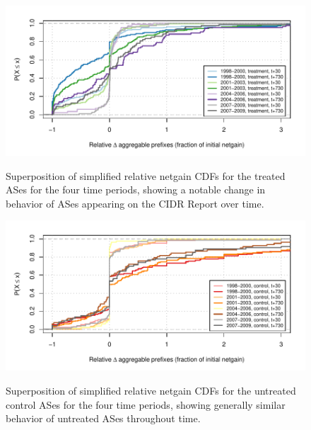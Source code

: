 \clearpage
\begin{figure}[H]
\begin{centering}
\begin{singlespace}
\captionsetup{list=no}
    \includegraphics[width=6in]
        {figures/behavior-rel_netgain-all-special_t.pdf}
    \vspace{-2em}\\
    \caption{Superposition of simplified relative netgain CDFs for the
    treated ASes for the four time periods, showing a notable change in
    behavior of ASes appearing on the CIDR Report over time.}
\end{singlespace}
\end{centering}
\end{figure}

\begin{figure}[H]
\begin{centering}
\begin{singlespace}
\captionsetup{list=no}
    \includegraphics[width=6in]
        {figures/behavior-rel_netgain-all-special_c.pdf}
    \vspace{-2em}\\
    \caption{Superposition of simplified relative netgain CDFs for the
    untreated control ASes for the four time periods, showing generally similar
    behavior of untreated ASes throughout time.}
\end{singlespace}
\end{centering}
\end{figure}

